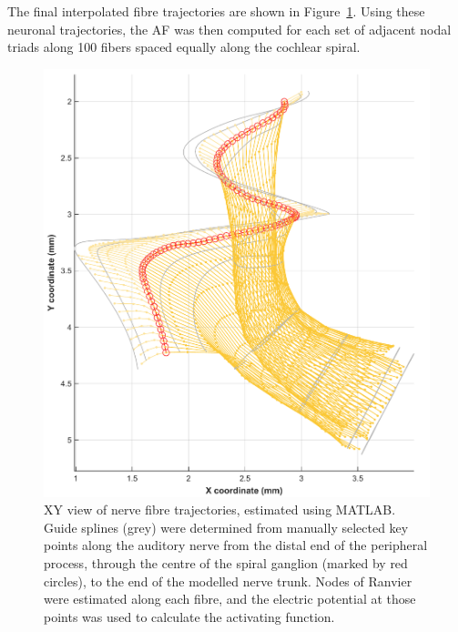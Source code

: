 The final interpolated fibre trajectories are shown in
Figure~\ref{fig:fibre_trajectories}. Using these neuronal trajectories, the AF
was then computed for each set of adjacent nodal triads along 100 fibers spaced
equally along the cochlear spiral.

\begin{figure}
	\centering
	\includegraphics[width=\textwidth]{Appendix/fibres-100}
	\caption[XY view of nerve fibre trajectories]{XY view of nerve fibre
	trajectories, estimated using MATLAB. Guide splines (grey) were determined
	from manually selected key points along the auditory nerve from the distal
	end of the peripheral process, through the centre of the spiral ganglion
	(marked by red circles), to the end of the modelled nerve trunk. Nodes of
	Ranvier were estimated along each fibre, and the electric potential at those
	points was used to calculate the activating function.}
	\label{fig:fibre_trajectories}
\end{figure}


